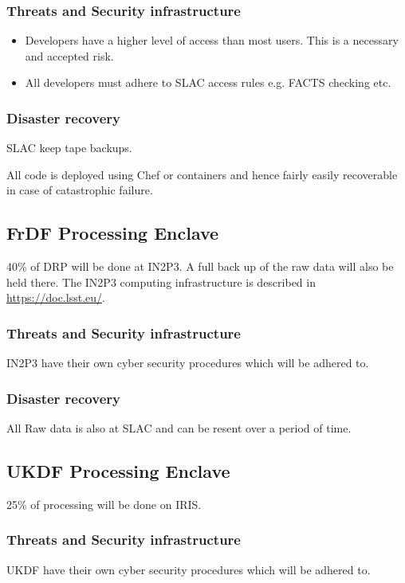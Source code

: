 \subsubsection{Threats and Security infrastructure}

\begin{itemize}
\item Developers have a higher level of access than most users.
This is a necessary and accepted risk.
\item All developers must adhere to  SLAC access rules e.g. FACTS checking etc.
\end{itemize}

\subsubsection{Disaster recovery}
SLAC keep tape backups.

All code is deployed using Chef or containers and hence fairly easily recoverable in case of catastrophic failure.



\subsection{FrDF Processing  \gls{Enclave}}
40\% of \gls{DRP} will be done at IN2P3.
A full back up of the raw data will also be held there.
The IN2P3 computing infrastructure is described in \url{https://doc.lsst.eu/}.
\subsubsection{Threats and Security infrastructure}
IN2P3 have their own cyber security procedures which will be adhered to.
\subsubsection{Disaster recovery}
All Raw data is also at SLAC and can be resent over a period of time.

\subsection{UKDF Processing  \gls{Enclave}}
25\% of processing will be done on \gls{IRIS}.
\subsubsection{Threats and Security infrastructure}
UKDF have their own cyber security procedures which will be adhered to.

